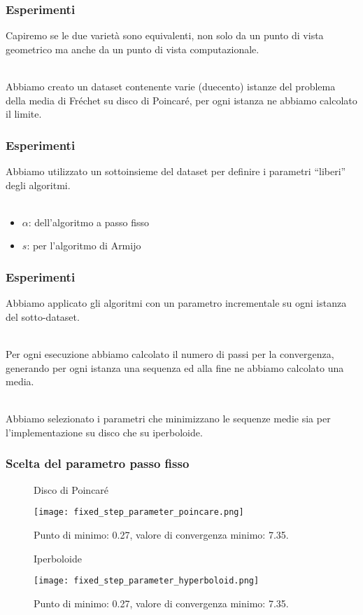 \documentclass{beamer}
\begin{document}
\begin{frame}
\frametitle{Esperimenti}
Capiremo se le due varietà sono equivalenti, non solo da un punto di vista geometrico ma anche da un punto di vista computazionale.\\~\

Abbiamo creato un dataset contenente varie (duecento) istanze del problema della media di Fréchet su disco di Poincaré, per ogni istanza ne abbiamo calcolato il limite.
\end{frame}

\begin{frame}
\frametitle{Esperimenti}
Abbiamo utilizzato un sottoinsieme del dataset per definire i parametri “liberi” degli algoritmi.\\~\

\begin{itemize}
    \item $\alpha$: dell’algoritmo a passo fisso
    \item $s$: per l’algoritmo di Armijo
\end{itemize}
\end{frame}

\begin{frame}
\frametitle{Esperimenti}
Abbiamo applicato gli algoritmi con un parametro incrementale su ogni istanza del sotto-dataset.\\~\

Per ogni esecuzione abbiamo calcolato il numero di passi per la convergenza, generando per ogni istanza una sequenza ed alla fine ne abbiamo calcolato una media.\\~\

Abbiamo selezionato i parametri che minimizzano le sequenze medie sia per l’implementazione su disco che su iperboloide.
\end{frame}


\begin{frame}
\frametitle{Scelta del parametro passo fisso}
\begin{figure}[ht]
    \begin{minipage}[b]{0.45\linewidth}
        \centering
        Disco di Poincaré\par\medskip
        \texttt{[image: fixed\_step\_parameter\_poincare.png]}
        \caption{Punto di minimo: 0.27, valore di convergenza minimo: 7.35.}
    \end{minipage}
    \hspace{0.5cm}
    \begin{minipage}[b]{0.45\linewidth}
        \centering
        Iperboloide\par\medskip
        \texttt{[image: fixed\_step\_parameter\_hyperboloid.png]}
        \caption{Punto di minimo: 0.27, valore di convergenza minimo: 7.35.}
    \end{minipage}
\end{figure}
\end{frame}
\end{document}
